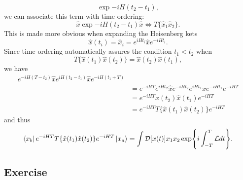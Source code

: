\begin{equation}
    \exp{-iH(t_2-t_1)},
\end{equation}
we can associate this term with time ordering: 
\begin{equation}
    \hat x \exp{-iH(t_2-t_1)} \hat x \Longleftrightarrow T\{\hat x_1 \hat x_2\}.
\end{equation}
This is made more obvious when expanding the Heisenberg kets
\begin{equation}
    \hat x (t_i)=\hat x_i=e^{iHt_i}\hat x e^{-iHt_i}. 
\end{equation}
Since time ordering automatically assures the condition $t_1<t_2$ when
\begin{equation}
    T\{\hat x(t_1)\hat x(t_2)\}=\hat x(t_2) \hat x(t_1),
\end{equation}
we have
\begin{align}
    e^{-iH(T-t_2)}\hat x e^{iH(t_2-t_1)}\hat x e^{-iH(t_1+T)}\\&=e^{-iHT}e^{iHt_2}\hat x e^{-iHt_2}e^{iHt_1}\hat x e^{-iHt_1}e^{-iHT}\\&=e^{-iHT}\hat x(t_2)\hat x(t_1)e^{-iHT}\\&=e^{-iHT}T\{\hat x(t_1)\hat x(t_2)\}e^{-iHT}
\end{align}
and thus
\begin{equation}
    \bra{x_b}e^{-iHT}T\{\hat x(t_1)\hat x(t_2)\}e^{-iHT}\ket{x_a}=\int \mathcal D [x(t)] x_1 x_2 \exp{i \int_{-T}^T \mathcal Ldt}.
\end{equation}


\subsection{Exercise}

